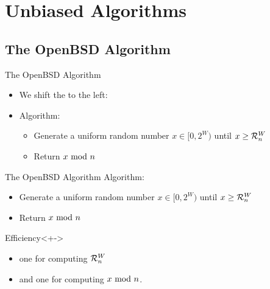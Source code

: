 \section{Unbiased Algorithms}

\subsection{The OpenBSD Algorithm}\label{sec:2.1}
\begin{frame}{The OpenBSD Algorithm}
    \pause 
    \begin{itemize}[<+->]
        \item We shift the  to the left:
        \item Algorithm: \begin{itemize}[<+->]
            \item Generate a uniform random number $x \in [0,2^W)$ until $x \geq \mathcal{R}_n^W$
            \item Return $x \ \mathrm{mod}\ n$
        \end{itemize} 
    \end{itemize}

\end{frame}

\begin{frame}{The OpenBSD Algorithm}
    Algorithm: \begin{itemize}
        \item Generate a uniform random number $x \in [0,2^W)$ until $x \geq \mathcal{R}_n^W$
        \item Return $x \ \mathrm{mod}\ n$
    \end{itemize} 
    \pause 
    \smallskip
    \begin{block}{Efficiency}<+->
         \begin{itemize}[<+->]
            \item one for computing $\mathcal{R}_n^W$
            \item and one for computing $x \ \mathrm{mod}\ n$.
        \end{itemize}
    \end{block}
    \vspace*{0.5cm} 
\end{frame}



